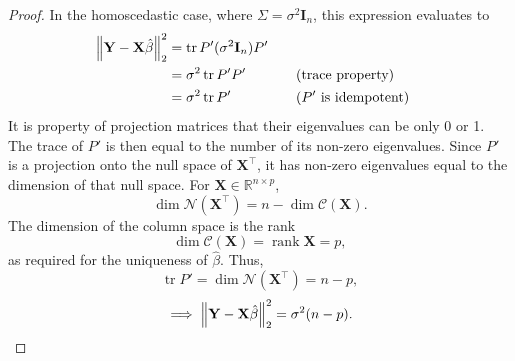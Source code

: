 \documentclass[letterpaper, reqno]{amsart}
\numberwithin{equation}{section}
\DeclarePairedDelimiter{\norm}{\lVert}{\rVert}
\newcommand{\T}{\top} %
\newcommand{\vect}[1]{\boldsymbol{\mathbf{#1}}} %
\newcommand{\R}{\mathbb{R}}  %
\newcommand{\by}[1]{&\quad&\text{(#1)}}
\newcommand{\Xm}{\vect{X}}
\newcommand{\Yv}{\vect{Y}}
\newcommand{\Bvh}{\hat{\beta}}
\DeclareMathOperator{\tr}{tr}
\DeclareMathOperator{\rank}{rank}
\begin{document}
\begin{proof}
  In the homoscedastic case, where $\Sigma = \sigma^2 \vect{I}_n$, this expression
  evaluates to 
  \begin{alignat*}{3}
    \norm*{\Yv - \Xm\Bvh}_2^2 &= \tr P'(\sigma^2 \vect{I}_n) P' \\
    &= \sigma^2 \tr P' P' \by{trace property} \\
    &= \sigma^2 \tr P' \by {$P'$ is idempotent}
  \end{alignat*}
  It is property of projection matrices that their eigenvalues can be only 0 or 1.
  The trace of $P'$ is then equal to the number of its non-zero eigenvalues.
  Since $P'$ is a projection onto the null space of $\Xm^\T$, it has non-zero
  eigenvalues equal to the dimension of that null space.
  For $\Xm \in \R^{n \times p}$,
  \[ \dim\mathscr{N}(\Xm^\T) = n - \dim \mathscr{C}(\Xm). \]
  The dimension of the column space is the rank
  \[ \dim \mathscr{C}(\Xm) = \rank \Xm = p, \]
  as required for the uniqueness of $\Bvh$. Thus,
  \[ \tr P' = \dim\mathscr{N}(\Xm^\T) = n - p, \]
  \[ \implies \norm*{\Yv - \Xm\Bvh}_2^2 = \sigma^2 (n - p). \qedhere \]
\end{proof}
\end{document}
